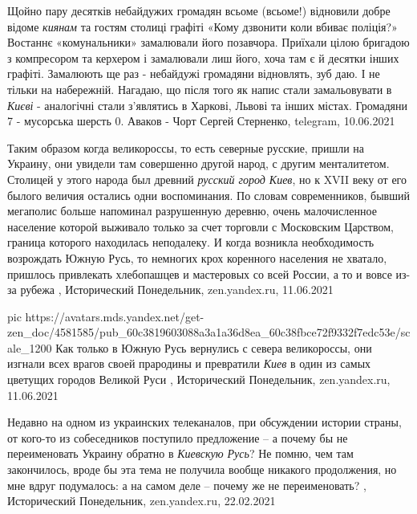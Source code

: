 Щойно пару десятків небайдужих громадян всьоме (всьоме!) відновили добре відоме
\emph{киянам} та гостям столиці графіті «Кому дзвонити коли вбиває поліція?» Востаннє
«комунальники» замалювали його позавчора. Приїхали цілою бригадою з компресором
та керхером і замалювали лиш його, хоча там є й десятки інших графіті.
Замалюють ще раз - небайдужі громадяни відновлять, зуб даю. І не тільки на
набережній.  Нагадаю, що після того як напис стали замальовувати в \emph{Києві} -
аналогічні стали з’являтись в Харкові, Львові та інших містах.  Громадяни 7 -
мусорська шерсть 0.  Аваков - Чорт
Сергей Стерненко, telegram, 10.06.2021


Таким образом когда великороссы, то есть северные русские, пришли на Украину,
они увидели там совершенно другой народ, с другим менталитетом. Столицей у
этого народа был древний \emph{русский город Киев}, но к XVII веку от его
былого величия остались одни воспоминания. По словам современников, бывший
мегаполис больше напоминал разрушенную деревню, очень малочисленное население
которой выживало только за счет торговли с Московским Царством, граница
которого находилась неподалеку. И когда возникла необходимость возрождать Южную
Русь, то немногих крох коренного населения не хватало, пришлось привлекать
хлебопашцев и мастеровых со всей России, а то и вовсе из-за рубежа
, 
Исторический Понедельник, zen.yandex.ru, 11.06.2021

\ifcmt
  pic https://avatars.mds.yandex.net/get-zen_doc/4581585/pub_60c3819603088a3a1a36d8ea_60c38fbce72f9332f7edc53e/scale_1200
\fi
Как только в Южную Русь вернулись с севера великороссы, они изгнали всех врагов
своей прародины и превратили \emph{Киев} в один из самых цветущих городов Великой Руси
, 
Исторический Понедельник, zen.yandex.ru, 11.06.2021

Недавно на одном из украинских телеканалов, при обсуждении истории страны, от
кого-то из собеседников поступило предложение – а почему бы не переименовать
Украину обратно в \emph{Киевскую Русь}? Не помню, чем там закончилось, вроде бы
эта тема не получила вообще никакого продолжения, но мне вдруг подумалось: а на
самом деле – почему же не переименовать?
, 
Исторический Понедельник, zen.yandex.ru, 22.02.2021

